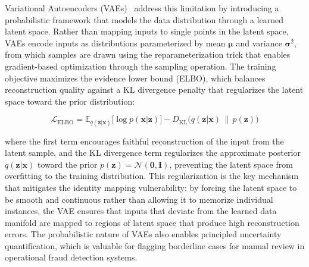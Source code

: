 Variational Autoencoders (VAEs)~\cite{kingma2014auto} address this limitation by
introducing a probabilistic framework that models the data distribution through
a learned latent space. Rather than mapping inputs to single points in the
latent space, VAEs encode inputs as distributions parameterized by mean
$\boldsymbol{\mu}$ and variance $\boldsymbol{\sigma}^2$, from which samples are
drawn using the reparameterization trick that enables gradient-based
optimization through the sampling operation. The training objective maximizes
the evidence lower bound (ELBO), which balances reconstruction quality against a
KL divergence penalty that regularizes the latent space toward the prior
distribution:

\begin{equation}
\mathcal{L}_{\text{ELBO}} = \mathbb{E}_{q(\mathbf{z}|\mathbf{x})}\bigl[\log
p(\mathbf{x}|\mathbf{z})\bigr] - D_{\text{KL}}\bigl(q(\mathbf{z}|\mathbf{x})
\,\|\, p(\mathbf{z})\bigr)
\end{equation}

where the first term encourages faithful reconstruction of the input from the
latent sample, and the KL divergence term regularizes the approximate posterior
$q(\mathbf{z}|\mathbf{x})$ toward the prior $p(\mathbf{z}) =
\mathcal{N}(\mathbf{0}, \mathbf{I})$, preventing the latent space from
overfitting to the training distribution. This regularization is the key
mechanism that mitigates the identity mapping vulnerability: by forcing the
latent space to be smooth and continuous rather than allowing it to memorize
individual instances, the VAE ensures that inputs that deviate from the learned
data manifold are mapped to regions of latent space that produce high
reconstruction errors. The probabilistic nature of VAEs also enables principled
uncertainty quantification, which is valuable for flagging borderline cases for
manual review in operational fraud detection systems.

